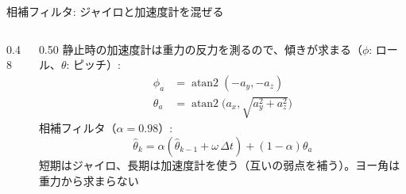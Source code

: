 \begin{frame}{相補フィルタ: ジャイロと加速度計を混ぜる}
  \begin{columns}[c]
    \begin{column}{0.48\textwidth}
      \centering
    \end{column}
    \begin{column}{0.50\textwidth}
      \footnotesize
      \setlength{\abovedisplayskip}{2pt}\setlength{\belowdisplayskip}{2pt}%
      静止時の加速度計は重力の反力を測るので、傾きが求まる（$\phi$: ロール、$\theta$: ピッチ）:
      \[
        \begin{aligned}
        \phi_a&=\operatorname{atan2}(-a_y,-a_z)\\
        \theta_a&=\operatorname{atan2}\bigl(a_x,\sqrt{a_y^2+a_z^2}\bigr)
        \end{aligned}
      \]
      相補フィルタ（$\alpha=0.98$）:
      \[
        \hat\theta_k=\alpha(\hat\theta_{k-1}+\omega\,\Delta t)+(1-\alpha)\theta_a
      \]
      短期はジャイロ、長期は加速度計を使う（互いの弱点を補う）。ヨー角は重力から求まらない
    \end{column}
  \end{columns}
\end{frame}

